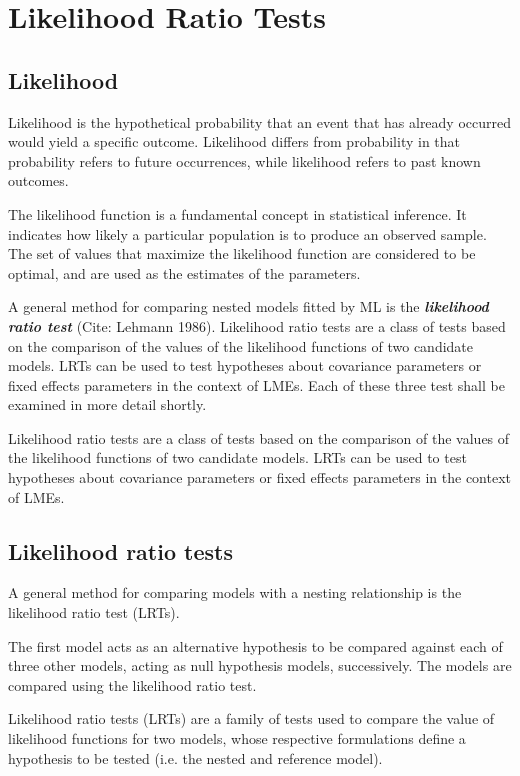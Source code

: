 \documentclass[12pt, a4paper]{report}
\theoremstyle{plain}
\theoremstyle{definition}
\theoremstyle{remark}
\begin{document}
\chapter{Likelihood Ratio Tests}
\section{Likelihood}
Likelihood is the hypothetical probability that an event that has
already occurred would yield a specific outcome. Likelihood
differs from probability in that probability refers to future
occurrences, while likelihood refers to past known outcomes.

The likelihood function is a fundamental concept in statistical inference. It indicates how likely a particular population is to produce an observed sample. The set of values that maximize the likelihood function are considered to be optimal, and are used as the estimates of the parameters.


A general method for comparing nested models fitted by ML is the \textbf{\emph{likelihood ratio test}} (Cite: Lehmann 1986).  Likelihood ratio tests are a class of tests based on the comparison of the values of the likelihood functions of two candidate models. LRTs can be used to test hypotheses about covariance parameters or fixed effects parameters in the context of LMEs.  Each of these three test shall be examined in more detail shortly.

Likelihood ratio tests are a class of tests based on the
comparison of the values of the likelihood functions of two
candidate models. LRTs can be used to test hypotheses about
covariance parameters or fixed effects parameters in the context
of LMEs.



 




\section{Likelihood ratio tests}
A general method for comparing models with a nesting relationship is the likelihood ratio test (LRTs). 

The first model acts as an alternative hypothesis to be compared against each of three other models, acting as null hypothesis models, successively. The models are compared using the likelihood ratio test. 
\bigskip

Likelihood ratio tests (LRTs) are a family of tests used to compare the value of likelihood functions for two models, whose respective formulations define a hypothesis to be tested (i.e. the nested and reference model).
\end{document}
